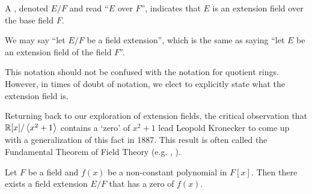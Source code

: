 \begin{definition}
    A , denoted $E/F$ and read ``$E$ over $F$'', indicates that $E$ is an extension field over the base field $F$.
\end{definition}
\begin{remark}
    We may say ``let $E/F$ be a field extension'', which is the same as saying ``let $E$ be an extension field of the field $F$''.
\end{remark}
\begin{remark}
    This notation should not be confused with the notation for quotient rings. However, in times of doubt of notation, we elect to explicitly state what the extension field is.
\end{remark}

Returning back to our exploration of extension fields, the critical observation that $\mathbb{R}[x]/\left\langle x^2+1\right\rangle$ contains a `zero' of $x^2+1$ lead Leopold Kronecker to come up with a generalization of this fact in 1887. This result is often called the Fundamental Theorem of Field Theory (e.g. \cite[Theorem 20.1]{gallian_2016}, \cite[Theorem 21.5]{judson_beezer_2022}).
\begin{theorem}\label{thrm-fundamental-theorem-of-field-theory}
    Let $F$ be a field and $f(x)$ be a non-constant polynomial in $F[x]$. Then there exists a field extension $E/F$ that has a zero of $f(x)$.
\end{theorem}
